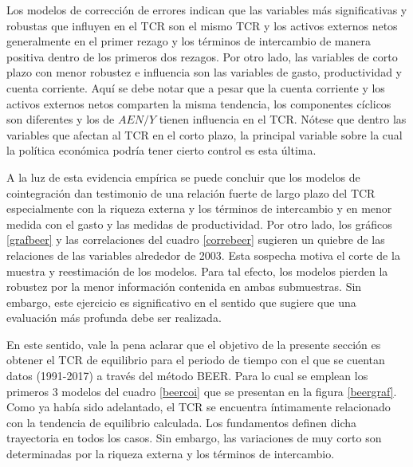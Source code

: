 \documentclass[12pt,letterpaper]{article}
\begin{document}
Los modelos de corrección de errores indican que las variables más significativas y robustas que influyen en el TCR son el mismo TCR y los activos externos netos generalmente en el primer rezago y los términos de intercambio de manera positiva dentro de los primeros dos rezagos. Por otro lado, las variables de corto plazo con menor robustez e influencia son las variables de gasto, productividad y cuenta corriente. Aquí se debe notar que a pesar que la cuenta corriente y los activos externos netos comparten la misma tendencia, los componentes cíclicos son diferentes y los de $AEN/Y$ tienen influencia en el TCR. Nótese que dentro las variables que afectan al TCR en el corto plazo, la principal variable sobre la cual la política económica podría tener cierto control es esta última.

A la luz de esta evidencia empírica se puede concluir que los modelos de cointegración dan testimonio de una relación fuerte de largo plazo del TCR especialmente con la riqueza externa y los términos de intercambio y en menor medida con el gasto y las medidas de productividad. Por otro lado, los gráficos \ref{grafbeer} y las correlaciones del cuadro \ref{correbeer} sugieren un quiebre de las relaciones de las variables alrededor de 2003. Esta sospecha motiva el corte de la muestra y reestimación de los modelos. Para tal efecto, los modelos pierden la robustez por la menor información contenida en ambas submuestras. Sin embargo, este ejercicio es significativo en el sentido que sugiere que una evaluación más profunda debe ser realizada. 

En este sentido, vale la pena aclarar que el objetivo de la presente sección es obtener el TCR de equilibrio para el periodo de tiempo con el que se cuentan datos (1991-2017) a través del método BEER. Para lo cual se emplean los primeros 3 modelos del cuadro \ref{beercoi} que se presentan en la figura \ref{beergraf}. Como ya había sido adelantado, el TCR se encuentra íntimamente relacionado con la tendencia de equilibrio calculada. Los fundamentos definen dicha trayectoria en todos los casos. Sin embargo, las variaciones de muy corto son determinadas por la riqueza externa y los términos de intercambio.
\end{document}
